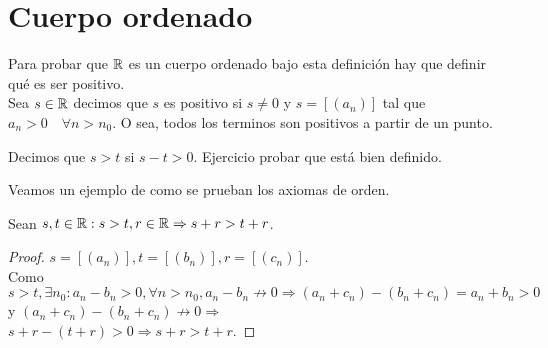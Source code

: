 \section{Cuerpo ordenado}

Para probar que \(\mathbb{R} \) es un cuerpo ordenado bajo esta definición hay que definir qué es ser positivo. \\
Sea \(s \in \mathbb{R} \) decimos que \(s\) es positivo si \(s \neq 0\) y \(s = [(a_n)]\) tal que \(a_n > 0 \quad \forall n > n_0\). O sea, todos los terminos son positivos a partir de un punto.

\begin{definition}
	Decimos que \(s > t\) si \(s-t > 0\).
	Ejercicio probar que está bien definido.
\end{definition}

Veamos un ejemplo de como se prueban los axiomas de orden.

\clearpage

\begin{theorem}
	Sean \(s, t \in \mathbb{R} : s > t, r \in \mathbb{R} \Rightarrow s+r > t+r\).
	\begin{proof}
		\(s = [(a_n)], t = [(b_n)], r = [(c_n)]\). \\
		Como \(s > t, \exists n_0 : a_n - b_n > 0, \forall n > n_0, a_n - b_n \not \to 0 \Rightarrow (a_n + c_n) - (b_n + c_n) = a_n + b_n > 0\) y \((a_n + c_n) - (b_n + c_n) \not \to 0 \Rightarrow \) \\
		\(s + r - (t + r) > 0 \Rightarrow s+r > t+r\).
	\end{proof}
\end{theorem}

